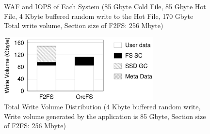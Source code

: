 \documentclass[pageno]{jpaper}
\begin{document}
\begin{figure}[t]
  \centering
   \caption{WAF and IOPS of Each System  (85 Gbyte Cold File, 85 Gbyte
     Hot File, 4 Kbyte buffered random write to the Hot File, 170
     Gbyte Total write volume, Section size of F2FS: 256
     Mbyte) \label{fig:f2fs_vs_usl}}
\end{figure}


\begin{figure}[t]
\begin{center}
\includegraphics[width=3.2in]{./comp_gc/io_distribution.eps}
\caption{Total Write Volume Distribution (4 Kbyte buffered random
  write, Write volume generated by the application is 85 Gbyte,
  Section size of F2FS: 256 Mbyte)}
\label{fig:io_distribution}
\end{center}
\end{figure}

\end{document}
